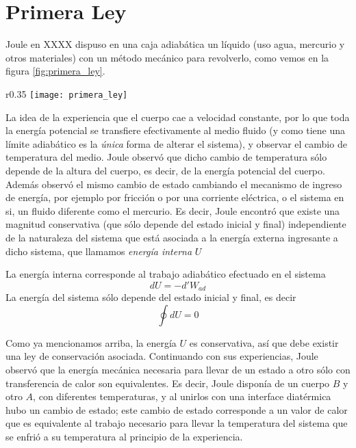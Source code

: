 \section{Primera Ley}
Joule en XXXX dispuso en una caja adiabática un líquido (uso agua, mercurio y otros materiales) con un método mecánico para revolverlo, como vemos en la figura \ref{fig:primera_ley}.
\begin{wrapfigure}{r}{0.35\linewidth}
\centering
\texttt{[image: primera\_ley]}
\caption{Experiencias de Joule}
\label{fig:primera_ley}
\end{wrapfigure}
La idea de la experiencia que el cuerpo cae a velocidad constante, por lo que toda la energía potencial se transfiere efectivamente al medio fluido (y como tiene una límite adiabático es la \emph{única} forma de alterar el sistema), y observar el cambio de temperatura del medio.
Joule observó que dicho cambio de temperatura sólo depende de la altura del cuerpo, es decir, de la energía potencial del cuerpo.
Además observó el mismo cambio de estado cambiando el mecanismo de ingreso de energía, por ejemplo por fricción o por una corriente eléctrica, o el sistema en si, un fluido diferente como el mercurio.
Es decir, Joule encontró que existe una magnitud conservativa (que sólo depende del estado inicial y final) independiente de la naturaleza del sistema que está asociada a la energía externa ingresante a dicho sistema, que llamamos \emph{energía interna} $U$
\begin{definition}
La energía interna corresponde al trabajo adiabático efectuado en el sistema
\begin{equation}
dU = - d'W_{ad}
\end{equation}
La energía del sistema sólo depende del estado inicial y final, es decir
\begin{equation}
\oint dU = 0
\end{equation}
\end{definition}
Como ya mencionamos arriba, la energía $U$ es conservativa, así que debe existir una ley de conservación asociada.
Continuando con sus experiencias, Joule observó que la energía mecánica necesaria para llevar de un estado a otro sólo con transferencia de calor son equivalentes.
Es decir, Joule disponía de un cuerpo $B$ y otro $A$, con diferentes temperaturas, y al unirlos con una interface diatérmica hubo un cambio de estado; este cambio de estado corresponde a un valor de calor que es equivalente al trabajo necesario para llevar la temperatura del sistema que se enfrió a su temperatura al principio de la experiencia.
